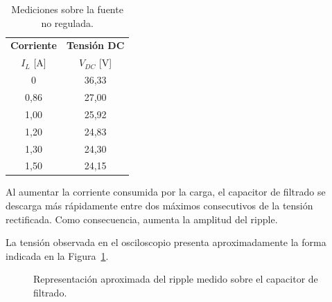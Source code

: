 \documentclass[12pt,a4paper]{article}
\begin{document}
	\begin{table}[H]
		\centering
		
		\caption{Mediciones sobre la fuente no regulada.}
		\label{tab:mediciones_no_regulada}
		
		\begin{tabular}{cc}
			
			\toprule
			
			\textbf{Corriente}
			&
			\textbf{Tensión DC}
		
			\\
			
			$I_L$ [A]
			&
			$V_{DC}$ [V]
			
		
			\\
			
			\midrule
			
			0    & 36,33  \\
			0,86 & 27,00  \\
			1,00 & 25,92  \\
			1,20 & 24,83  \\
			1,30 & 24,30  \\
			1,50 & 24,15  \\
			
			\bottomrule
			
		\end{tabular}
		
	\end{table}
	
	Al aumentar la corriente consumida por la carga, el capacitor de filtrado se
	descarga más rápidamente entre dos máximos consecutivos de la tensión
	rectificada. Como consecuencia, aumenta la amplitud del ripple.
	
	La tensión observada en el osciloscopio presenta aproximadamente la forma
	indicada en la Figura~\ref{fig:ripple_ensayo}.
	
	\begin{figure}[H]
		\centering
		
		
		\caption{Representación aproximada del ripple medido sobre el capacitor de
			filtrado.}
		\label{fig:ripple_ensayo}
		
	\end{figure}
	
\end{document}
